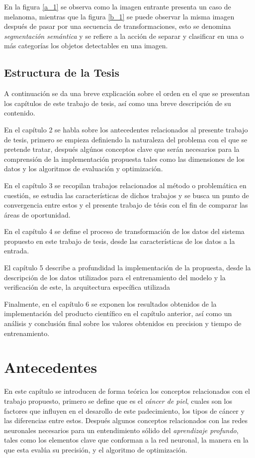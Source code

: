 En la figura \ref{a_1} se observa como la imagen entrante presenta un caso de melanoma, mientras que la figura \ref{b_1} se puede observar la misma imagen después de pasar por una secuencia de transformaciones, esto se denomina \emph{segmentación semántica} y se refiere a la acción de separar y clasificar en una o más categorías los objetos detectables en una imagen.

\section{Estructura de la Tesis}
A continuación se da una breve explicación sobre el orden en el que se presentan los capítulos de este trabajo de tesis, así como una breve descripción de su contenido.

En el capítulo 2 se habla sobre los antecedentes relacionados al presente trabajo de tesis, primero se empieza definiendo la naturaleza del problema con el que se pretende tratar, después algúnos conceptos clave que serán necesarios para la comprensión de la implementación propuesta tales como las dimensiones de los datos y los algoritmos de evaluación y optimización.

En el capítulo 3 se recopilan trabajos relacionados al método o problemática en cuestión, se estudia las características de dichos trabajos y se busca un punto de convergencia entre estos y el presente trabajo de tésis con el fin de comparar las áreas de oportunidad.

En el capítulo 4 se define el proceso de transformación de los datos del sistema propuesto en este trabajo de tesis, desde las características de los datos a la entrada.

El capítulo 5 describe a profundidad la implementación de la propuesta, desde la descripción de los datos utilizados para el entrenamiento del modelo y la verificación de este, la arquitectura específica utilizada 


Finalmente, en el capítulo 6 se exponen los resultados obtenidos de la implementación del producto científico en el capítulo anterior, así como un análisis y conclusión final sobre los valores obtenidos en precision y tiempo de entrenamiento. 

\chapter{Antecedentes}
En este capítulo se introducen de forma teórica los conceptos relacionados con el trabajo propuesto, primero se define que es el \emph{cáncer de piel}, cuales son los factores que influyen en el desarollo de este padecimiento, los tipos de cáncer y las diferencias entre estos. Después algunos conceptos relacionados con las redes neuronales necesarios para un entendimiento sólido del \emph{aprendizaje profundo}, tales como los elementos clave que conforman a la red neuronal, la manera en la que esta evalúa su precisión, y el algoritmo de optimización.

